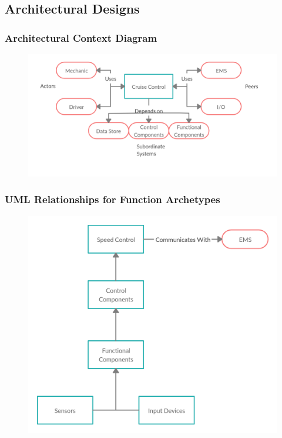 \documentclass{article}
\begin{document}
	\subsection{Architectural Designs}
	
	\subsubsection{Architectural Context Diagram}
	\begin{figure}[!htb]
		\centering
		\includegraphics[scale=.34]{cs347_5a}
	\end{figure}
	
	\subsubsection{UML Relationships for Function Archetypes}
	\begin{figure}[!htb]
		\centering
		\includegraphics[scale=.28]{cs347_5c}
	\end{figure}
	
\end{document}
